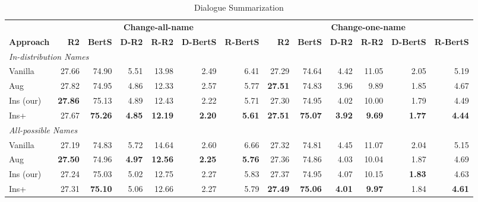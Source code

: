 \begin{table}[th!]
	\scriptsize
	\centering
	\begin{subtable}{\linewidth}
		\scriptsize
		\centering
		\begin{tabular}{p{1.2cm}|rrrrrr|rrrrrr}
			\toprule[1pt]
			& \multicolumn{6}{c|}{\textbf{Change-all-name}} & \multicolumn{6}{c}{\textbf{Change-one-name}} \\
			\textbf{Approach} & \textbf{R2} & \textbf{BertS} & \textbf{D-R2} & \textbf{R-R2} & \textbf{D-BertS} & \textbf{R-BertS} & \textbf{R2} & \textbf{BertS} & \textbf{D-R2} & \textbf{R-R2} & \textbf{D-BertS} & \textbf{R-BertS} \\
			
			\hline
			\multicolumn{13}{l}{\textit{In-distribution Names}}\\
			Vanilla & 27.66 & 74.90 & 5.51 & 13.98 & 2.49&6.41&
			27.29 & 74.64 & 4.42& 11.05& 2.05&5.19 \\
			Aug & 27.82 & 74.95 & {4.86} & {12.33} & 2.57 & 5.77 &
			\textbf{27.51} & 74.83 & {3.96} & {9.89} & 1.85 & 4.67 \\
			Ins (our) & \textbf{27.86}& {75.13} & 4.89 & 12.43 & {2.22} & {5.71} &
			27.30 & {74.95} & 4.02 & 10.00 & {1.79} & {4.49} \\
			Ins+ & 27.67 & \textbf{75.26} & \textbf{4.85} & \textbf{12.19} & \textbf{2.20} & \textbf{5.61} & \textbf{27.51} & \textbf{75.07}& \textbf{3.92} & \textbf{9.69} & \textbf{1.77} & \textbf{4.44} \\
			
			\hline
			\multicolumn{13}{l}{\textit{All-possible Names}}\\
			Vanilla & 27.19 & 74.83 & 5.72 & 14.64 & 2.60 & 6.66&
			27.32& 74.81 & 4.45 & 11.07 & 2.04 &5.15 \\
			Aug & \textbf{27.50} & 74.96 & \textbf{4.97 }& \textbf{12.56} & \textbf{2.25} & \textbf{5.76} &
			27.36 & 74.86 & {4.03} & {10.04} & 1.87 & 4.69 \\
			Ins (our) & 27.24 & {75.03} & 5.02 & 12.75 & 2.27 & 5.83 &
			{27.37} & {74.95} & 4.07 & 10.15 & \textbf{1.83} & {4.63} \\
			Ins+ & 27.31 & \textbf{75.10} & 5.06 & 12.66 & 2.27 & 5.79 & \textbf{27.49} &\textbf{75.06} & \textbf{4.01} & \textbf{9.97 }& 1.84 & \textbf{4.61} \\
			\bottomrule[1pt]
		\end{tabular}
		\caption{Dialogue Summarization}
		\label{tab:mdresults-ds}
	\end{subtable}
	

\end{table}
